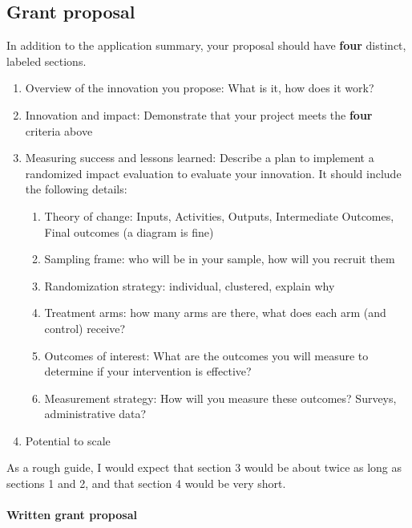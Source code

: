 \documentclass[11pt]{article}
\begin{document}
\hypertarget{grant-proposal}{%
\subsection*{Grant proposal}\label{grant-proposal}}

In addition to the application summary, your proposal should have \textbf{four} distinct, labeled sections.



\begin{enumerate}
\def\labelenumi{(\arabic{enumi})}
\item
  Overview of the innovation you propose: What is it, how does it work? 
\item
  Innovation and impact: Demonstrate that your project meets the \textbf{four} criteria above
\item
  Measuring success and lessons learned: Describe a plan to implement a
  randomized impact evaluation to evaluate your innovation. It should
  include the following details:


\begin{enumerate}

\item
  Theory of change: Inputs, Activities, Outputs, Intermediate Outcomes,
  Final outcomes (a diagram is fine)
\item
  Sampling frame: who will be in your sample, how will you recruit them
\item
  Randomization strategy: individual, clustered, explain why
\item
  Treatment arms: how many arms are there, what does each arm (and
  control) receive?
\item
  Outcomes of interest: What are the outcomes you will measure to
  determine if your intervention is effective?
\item
  Measurement strategy: How will you measure these outcomes? Surveys,
  administrative data?
\end{enumerate}
\item
  Potential to scale


\end{enumerate}

As a rough guide, I would expect that section 3 would be about twice as
long as sections 1 and 2, and that section 4 would be very short.

\hypertarget{written-grant-proposal}{%
\paragraph{Written grant proposal}\label{written-grant-proposal}}
\end{document}
